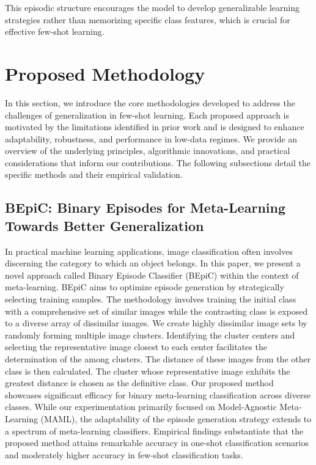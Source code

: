 This episodic structure encourages the model to develop generalizable learning strategies rather than memorizing specific class features, which is crucial for effective few-shot learning.

\section{Proposed Methodology}

In this section, we introduce the core methodologies developed to address the challenges of generalization in few-shot learning. Each proposed approach is motivated by the limitations identified in prior work and is designed to enhance adaptability, robustness, and performance in low-data regimes. We provide an overview of the underlying principles, algorithmic innovations, and practical considerations that inform our contributions. The following subsections detail the specific methods and their empirical validation.

\subsection{BEpiC: Binary Episodes for Meta-Learning Towards Better Generalization}

In practical machine learning applications, image classification often involves discerning the category to which an object belongs. In this paper, we present a novel approach called Binary Episode Classifier (BEpiC) within the context of meta-learning. BEpiC aims to optimize episode generation by strategically selecting training samples. The methodology involves training the initial class with a comprehensive set of similar images while the contrasting class is exposed to a diverse array of dissimilar images. We create highly dissimilar image sets by randomly forming multiple image clusters. Identifying the cluster centers and selecting the representative image closest to each center facilitates the determination of the among clusters. The distance of these images from the other class is then calculated. The cluster whose representative image exhibits the greatest distance is chosen as the definitive class. Our proposed method showcases significant efficacy for binary meta-learning classification across diverse classes. While our experimentation primarily focused on Model-Agnostic Meta-Learning (MAML), the adaptability of the episode generation strategy extends to a spectrum of meta-learning classifiers. Empirical findings substantiate that the proposed method attains remarkable accuracy in one-shot classification scenarios and moderately higher accuracy in few-shot classification tasks.

